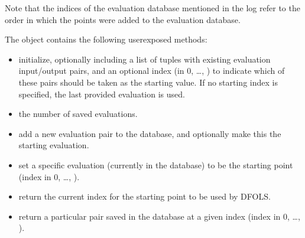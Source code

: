 \documentclass[letterpaper,10pt,english]{sphinxmanual}
\begin{document}
\sphinxAtStartPar
Note that the indices of the evaluation database mentioned in the log refer to the order in which the points were added to the evaluation database.

\sphinxAtStartPar
The  object contains the following user\sphinxhyphen{}exposed methods:
\begin{itemize}
\item {} 
\sphinxAtStartPar
{} \sphinxhyphen{} initialize, optionally including a list of tuples  with existing evaluation input/output pairs, and an optional index (in 0, …, ) to indicate which of these  pairs should be taken as the starting value. If no starting index is specified, the last provided evaluation  is used.

\item {} 
\sphinxAtStartPar
{} \sphinxhyphen{} the number of saved evaluations.

\item {} 
\sphinxAtStartPar
{} \sphinxhyphen{} add a new evaluation  pair to the database, and optionally make this the starting evaluation.

\item {} 
\sphinxAtStartPar
{} \sphinxhyphen{} set a specific evaluation (currently in the database) to be the starting point (index in 0, …, ).

\item {} 
\sphinxAtStartPar
{} \sphinxhyphen{} return the current index for the starting point to be used by DFO\sphinxhyphen{}LS.

\item {} 
\sphinxAtStartPar
{} \sphinxhyphen{} return a particular  pair saved in the database at a given index (index in 0, …, ).


\end{itemize}
\end{document}
